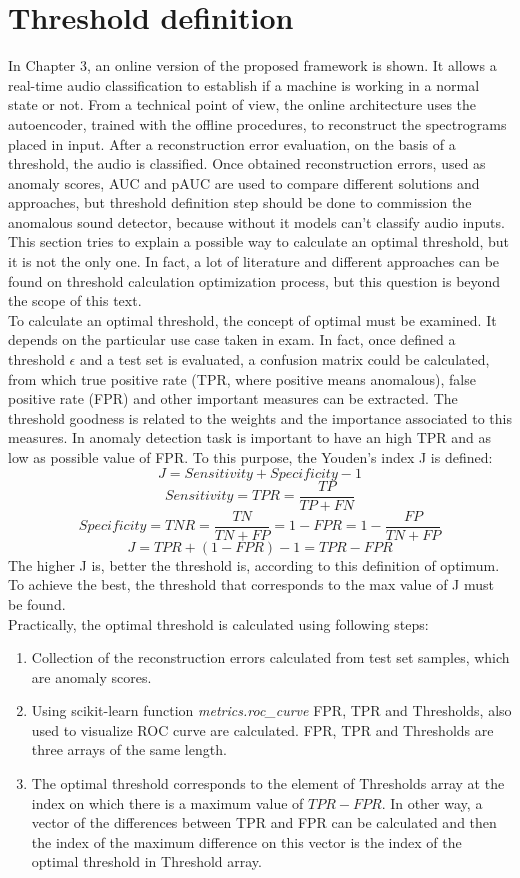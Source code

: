 \section{Threshold definition}
In Chapter 3, an online version of the proposed framework is shown. It allows a real-time audio classification to establish if a machine is working in a normal state or not. From a technical point of view, the online architecture uses the autoencoder, trained with the offline procedures, to reconstruct the spectrograms placed in input. After a reconstruction error evaluation, on the basis of a threshold, the audio is classified. Once obtained reconstruction errors, used as anomaly scores, AUC and pAUC are used to compare different solutions and approaches, but threshold definition step should be done to commission the anomalous sound detector, because without it models can't classify audio inputs. This section tries to explain a possible way to calculate an optimal threshold, but it is not the only one. In fact, a lot of literature and different approaches can be found on threshold calculation optimization process, but this question is beyond the scope of this text. \\
To calculate an optimal threshold, the concept of optimal must be examined. It depends on the particular use case taken in exam. In fact, once defined a threshold $\epsilon$ and a test set is evaluated, a confusion matrix could be calculated, from which true positive rate (TPR, where positive means anomalous), false positive rate (FPR) and other important measures can be extracted. The threshold goodness is related to the weights and the importance associated to this measures. In anomaly detection task is important to have an high TPR and as low as possible value of FPR. To this purpose, the Youden's index J is defined\cite{13RealTimeDetectionUsingSequentialAutoencoder}:
\[ J = Sensitivity + Specificity - 1\]\[ Sensitivity = TPR = \frac{TP}{TP+FN}\]\[ Specificity = TNR = \frac{TN}{TN+FP} = 1-FPR = 1-\frac{FP}{TN+FP}\]\[ J = TPR+(1-FPR)-1 = TPR-FPR \]
The higher J is, better the threshold is, according to this definition of optimum. To achieve the best, the threshold that corresponds to the max value of J must be found.\\
Practically, the optimal threshold is calculated using following steps:
\begin{enumerate}
    \item {Collection of the reconstruction errors calculated from test set samples, which are anomaly scores.}
    \item {Using scikit-learn function \textit{metrics.roc\_curve} FPR, TPR and Thresholds, also used to visualize ROC curve are calculated. FPR, TPR and Thresholds are three arrays of the same length.}
    \item {The optimal threshold corresponds to the element of Thresholds array at the index on which there is a maximum value of $TPR-FPR$. In other way, a vector of the differences between TPR and FPR can be calculated and then the index of the maximum difference on this vector is the index of the optimal threshold in Threshold array.}
\end{enumerate}
